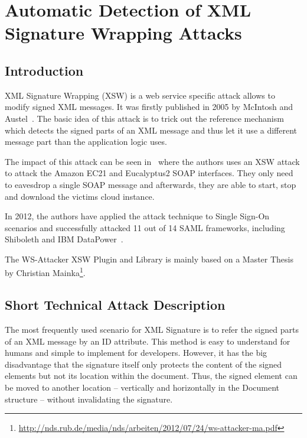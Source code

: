 \section{Automatic Detection of XML Signature Wrapping Attacks}
\label{sec:automatic_detection_of_xml_signature_wrapping_attacks}

\subsection{Introduction}
\label{sec:introduction}

XML Signature Wrapping (XSW) is a web service specific attack allows to modify signed
XML messages. 
It was firstly published in 2005 by McIntosh and Austel~\cite{xsw}. 
The basic idea of this attack is to trick out the reference mechanism which detects the signed parts
of an XML message and thus let it use a different message part than the application
logic uses.

The impact of this attack can be seen in~\cite{amazon} where the authors uses an XSW attack to
attack the Amazon EC21 and Eucalyptus2 SOAP interfaces. They only need to eavesdrop
a single SOAP message and afterwards, they are able to start, stop and download the
victims cloud instance.

In 2012, the authors have applied the attack technique to Single Sign-On scenarios and successfully attacked 11 out of 14 SAML frameworks, including Shiboleth and IBM DataPower~\cite{samlattacking}.

The WS-Attacker XSW Plugin and Library is mainly based on a Master Thesis by Christian Mainka\footnote{\url{http://nds.rub.de/media/nds/arbeiten/2012/07/24/ws-attacker-ma.pdf}}.

\subsection{Short Technical Attack Description}
\label{sec:short_technical_attack_description}

The most frequently used scenario for XML Signature is to refer the signed parts of an XML message by an ID attribute. 
This method is easy to understand for humans and simple to implement for developers. 
However, it has the big disadvantage that the signature itself only protects the content of the signed elements but not its location within the document. 
Thus, the signed element can be moved to another location -- vertically and horizontally in the Document structure -- without invalidating the signature. 

